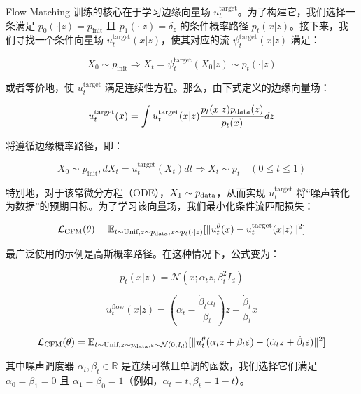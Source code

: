 \begin{summarybox}
Flow Matching 训练的核心在于学习边缘向量场 $u_t^{\mathrm{target}}$。为了构建它，我们选择一条满足 $p_0(\cdot|z) = p_{\mathrm{init}}$ 且 $p_1(\cdot|z) = \delta_z$ 的条件概率路径 $p_t(x|z)$。接下来，我们寻找一个条件向量场 $u_t^{\mathrm{target}}(x|z)$，使其对应的流 $\psi_t^{\mathrm{target}}(x|z)$ 满足：

\begin{equation}
X_0 \sim p_{\mathrm{init}} \Rightarrow X_t = \psi_t^{\mathrm{target}}(X_0|z) \sim p_t(\cdot|z)
\end{equation}

或者等价地，使 $u_t^{\mathrm{target}}$ 满足连续性方程。那么，由下式定义的边缘向量场：

\begin{equation}
u_t^{\mathrm{target}}(x) = \int u_t^{\mathrm{target}}(x|z) \frac{p_t(x|z)p_{\mathrm{data}}(z)}{p_t(x)} dz
\end{equation}

将遵循边缘概率路径，即：

\begin{equation}
X_0 \sim p_{\mathrm{init}}, dX_t = u_t^{\mathrm{target}}(X_t)dt \Rightarrow X_t \sim p_t \quad (0 \leq t \leq 1)
\end{equation}

特别地，对于该常微分方程（ODE），$X_1 \sim p_{\mathrm{data}}$，从而实现 $u_t^{\mathrm{target}}$ 将“噪声转化为数据”的预期目标。为了学习该向量场，我们最小化条件流匹配损失：

\begin{equation}
\mathcal{L}_{\text{CFM}}(\theta) = \mathbb{E}_{t \sim \text{Unif}, z \sim p_{\mathrm{data}}, x \sim p_t(\cdot|z)}[\|u_t^\theta(x) - u_t^{\mathrm{target}}(x|z)\|^2]
\end{equation}

最广泛使用的示例是高斯概率路径。在这种情况下，公式变为：

\begin{equation}
p_t(x|z) = \mathcal{N}(x; \alpha_t z, \beta_t^2 I_d)
\end{equation}

\begin{equation}
u_t^{\text{flow}}(x|z) = \left( \dot{\alpha}_t - \frac{\dot{\beta}_t \alpha_t}{\beta_t} \right) z + \frac{\dot{\beta}_t}{\beta_t} x
\end{equation}

\begin{equation}
\mathcal{L}_{\text{CFM}}(\theta) = \mathbb{E}_{t \sim \text{Unif}, z \sim p_{\mathrm{data}}, \varepsilon \sim \mathcal{N}(0, I_d)}[\|u_t^\theta(\alpha_t z + \beta_t \varepsilon) - (\dot{\alpha}_t z + \dot{\beta}_t \varepsilon)\|^2]
\end{equation}

其中噪声调度器 $\alpha_t, \beta_t \in \mathbb{R}$ 是连续可微且单调的函数，我们选择它们满足 $\alpha_0 = \beta_1 = 0$ 且 $\alpha_1 = \beta_0 = 1$（例如，$\alpha_t = t, \beta_t = 1 - t$）。
\end{summarybox}

